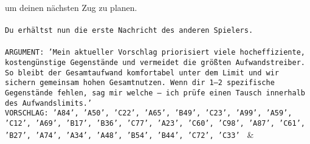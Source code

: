 \documentclass{article}
\begin{document}
{{{um deinen nächsten Zug zu planen.\\ \tt \\ \tt Du erhältst nun die erste Nachricht des anderen Spielers.\\ \tt \\ \tt ARGUMENT: {'Mein aktueller Vorschlag priorisiert viele hocheffiziente, kostengünstige Gegenstände und vermeidet die größten Aufwandstreiber. So bleibt der Gesamtaufwand komfortabel unter dem Limit und wir sichern gemeinsam hohen Gesamtnutzen. Wenn dir 1–2 spezifische Gegenstände fehlen, sag mir welche – ich prüfe einen Tausch innerhalb des Aufwandslimits.'}\\ \tt VORSCHLAG: {'A84', 'A50', 'C22', 'A65', 'B49', 'C23', 'A99', 'A59', 'C12', 'A69', 'B17', 'B36', 'C77', 'A23', 'C60', 'C98', 'A87', 'C61', 'B27', 'A74', 'A34', 'A48', 'B54', 'B44', 'C72', 'C33'} 
	  } 
	   } 
	   } 
	 & \\ 
 

    \theutterance {}  
\end{document}
